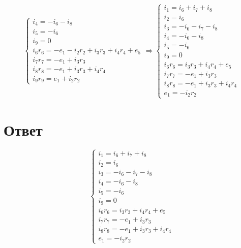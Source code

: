 \documentclass{article}
\begin{document}
\begin{align*}
\begin{cases}
        i_4 = -i_6 - i_8 \\
        i_5 = -i_6 \\
        i_9 = 0 \\
        i_6r_6 = -e_1 - i_2r_2 + i_3r_3 + i_4r_4 + e_5 \\
        i_7r_7 = -e_1 + i_3r_3 \\
        i_8r_8 = -e_1 + i_3r_3 + i_4r_4 \\
        i_9r_9 = e_1 + i_2r_2
    \end{cases}
    \Longrightarrow
    \begin{cases}
        i_1 = i_6 + i_7 + i_8 \\
        i_2 = i_6 \\
        i_3 = -i_6 - i_7 - i_8 \\
        i_4 = -i_6 - i_8 \\
        i_5 = -i_6 \\
        i_9 = 0 \\
        i_6r_6 = i_3r_3 + i_4r_4 + e_5 \\
        i_7r_7 = -e_1 + i_3r_3 \\
        i_8r_8 = -e_1 + i_3r_3 + i_4r_4 \\
        e_1 = -i_2r_2
    \end{cases}
\end{align*}


\section*{Ответ}
\begin{equation*}
    \begin{cases}
        i_1 = i_6 + i_7 + i_8 \\
        i_2 = i_6 \\
        i_3 = -i_6 - i_7 - i_8 \\
        i_4 = -i_6 - i_8 \\
        i_5 = -i_6 \\
        i_9 = 0 \\
        i_6r_6 = i_3r_3 + i_4r_4 + e_5 \\
        i_7r_7 = -e_1 + i_3r_3 \\
        i_8r_8 = -e_1 + i_3r_3 + i_4r_4 \\
        e_1 = -i_2r_2
    \end{cases}
\end{equation*}
\end{document}
